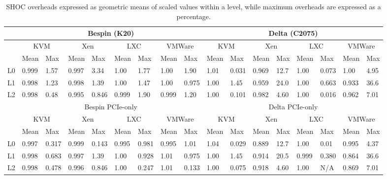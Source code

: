 \begin{table*}
\footnotesize
\caption{SHOC overheads expressed as geometric means of scaled values within a
level, while maximum overheads are expressed as a percentage.  }
\label{MEANS}
\centering
    \begin{tabular}{|l|l|l|l|l|l|l|l|l|l|l|l|l|l|l|l|l|}
    \hline 
    ~  & \multicolumn{8}{c|}{Bespin (K20)} & \multicolumn{8}{c|}{Delta (C2075)} \\ \hline
    ~  & \multicolumn{2}{c|}{KVM} & \multicolumn{2}{c|}{Xen} & \multicolumn{2}{c|}{LXC} & \multicolumn{2}{c|}{VMWare} & \multicolumn{2}{c|}{KVM} & \multicolumn{2}{c|}{Xen} & \multicolumn{2}{c|}{LXC} & \multicolumn{2}{c|}{VMWare} \\ \hline 
    ~  & Mean   & Max & Mean & Max & Mean & Max & Mean & Max & Mean  & Max & Mean & Max & Mean & Max & Mean   & Max \\ \hline 
    L0 & 0.999   & 1.57   & 0.997 & 3.34   & 1.00   & 1.77  & 1.00  & 1.90   & 1.01     & 0.031   & 0.969    & 12.7  & 1.00  & 0.073   & 1.00  & 4.95    \\ \hline 
    L1 & 0.998   & 1.23   & 0.998 & 1.39   & 1.00   & 1.47  & 1.00  & 0.975  & 1.00     & 1.45    & 0.959    & 24.0  & 1.00  & 0.663   & 0.933 & 36.6    \\ \hline 
    L2 & 0.998   & 0.48   & 0.995 & 0.846  & 0.999  & 1.90  & 0.999 & 1.20   & 1.00     & 0.101   & 0.982    & 4.60  & 1.00  & 0.016   & 0.962 & 7.01    \\ \hline
    ~  & \multicolumn{8}{c|}{Bespin PCIe-only} & \multicolumn{8}{c|}{Delta PCIe-only} \\ \hline
    ~  & \multicolumn{2}{c|}{KVM} & \multicolumn{2}{c|}{Xen} & \multicolumn{2}{c|}{LXC} & \multicolumn{2}{c|}{VMWare} & \multicolumn{2}{c|}{KVM} & \multicolumn{2}{c|}{Xen} & \multicolumn{2}{c|}{LXC} & \multicolumn{2}{c|}{VMWare} \\ \hline 
    ~  & Mean   & Max & Mean & Max & Mean & Max & Mean & Max & Mean  & Max & Mean & Max & Mean & Max & Mean   & Max \\ \hline 
    L0 & 0.997   & 0.317   & 0.999  & 0.143 & 0.995  & 0.981  & 0.995 & 1.01  & 1.04     & 0.029   & 0.889    & 12.7  & 1.00  & 0.01  & 0.995  & 4.37    \\ \hline 
    L1 & 0.998   & 0.683   & 0.997  & 1.39  & 1.00   & 0.928  & 1.01  & 0.975 & 1.00     & 1.45    & 0.914    & 20.5  & 0.999 & 0.380 & 0.864  & 36.6    \\ \hline 
    L2 & 0.998   & 0.478   & 0.996  & 0.846 & 1.00   & 0.247  & 1.01  & 0.133 & 1.00     & 0.075   & 0.918    & 4.60  & 1.00  & N/A   & 0.869  & 7.01    \\ \hline
    \end{tabular}
\end{table*}
